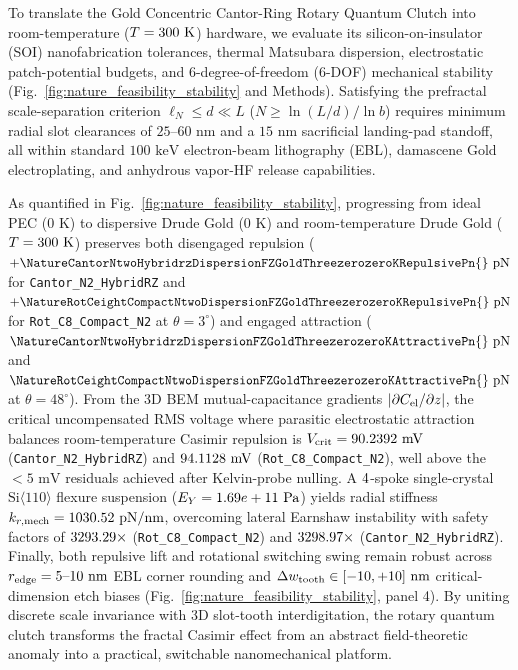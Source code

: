 \documentclass[11pt,letterpaper]{article}
\begin{document}
To translate the Gold Concentric Cantor-Ring Rotary Quantum Clutch into room-temperature ($T = 300{}\text{ K}$) hardware, we evaluate its silicon-on-insulator (SOI) nanofabrication tolerances, thermal Matsubara dispersion, electrostatic patch-potential budgets, and 6-degree-of-freedom (6-DOF) mechanical stability (Fig.~\ref{fig:nature_feasibility_stability} and Methods). Satisfying the prefractal scale-separation criterion\cite{gordon2026prd} $\ell_N \le d \ll L$ ($N \ge \ln(L/d)/\ln b$) requires minimum radial slot clearances of $25\text{--}60\text{ nm}$ and a $15\text{ nm}$ sacrificial landing-pad standoff, all within standard $100\text{ keV}$ electron-beam lithography (EBL), damascene Gold electroplating, and anhydrous vapor-HF release capabilities.

As quantified in Fig.~\ref{fig:nature_feasibility_stability}, progressing from ideal PEC ($0\text{ K}$) to dispersive Drude Gold ($0\text{ K}$) and room-temperature Drude Gold ($T = 300{}\text{ K}$) preserves both disengaged repulsion ($+\NatureCantorNtwoHybridrzDispersionFZGoldThreezerozeroKRepulsivePn{}\text{ pN}$ for \texttt{Cantor\_N2\_HybridRZ} and $+\NatureRotCeightCompactNtwoDispersionFZGoldThreezerozeroKRepulsivePn{}\text{ pN}$ for \texttt{Rot\_C8\_Compact\_N2} at $\theta=3^\circ$) and engaged attraction ($\NatureCantorNtwoHybridrzDispersionFZGoldThreezerozeroKAttractivePn{}\text{ pN}$ and $\NatureRotCeightCompactNtwoDispersionFZGoldThreezerozeroKAttractivePn{}\text{ pN}$ at $\theta=48^\circ$). From the 3D BEM mutual-capacitance gradients $|\partial C_{\rm el}/\partial z|$, the critical uncompensated RMS voltage where parasitic electrostatic attraction balances room-temperature Casimir repulsion is $V_{\rm crit} = 90.2392{}\text{ mV}$ (\texttt{Cantor\_N2\_HybridRZ}) and $94.1128{}\text{ mV}$ (\texttt{Rot\_C8\_Compact\_N2}), well above the $<5\text{ mV}$ residuals achieved after Kelvin-probe nulling. A $4{}$-spoke single-crystal $\text{Si}\langle 110\rangle$ flexure suspension ($E_Y = 1.69e+11{}\text{ Pa}$) yields radial stiffness $k_{r,\rm mech} = 1030.52{}\text{ pN/nm}$, overcoming lateral Earnshaw instability with safety factors of $3293.29{}\times$ (\texttt{Rot\_C8\_Compact\_N2}) and $3298.97{}\times$ (\texttt{Cantor\_N2\_HybridRZ}). Finally, both repulsive lift and rotational switching swing remain robust across $r_{\rm edge} = 5\text{--}10\text{ nm}$ EBL corner rounding and $\Delta w_{\rm tooth} \in [-10, +10]\text{ nm}$ critical-dimension etch biases (Fig.~\ref{fig:nature_feasibility_stability}, panel 4). By uniting discrete scale invariance with 3D slot-tooth interdigitation, the rotary quantum clutch transforms the fractal Casimir effect from an abstract field-theoretic anomaly into a practical, switchable nanomechanical platform.
\end{document}
